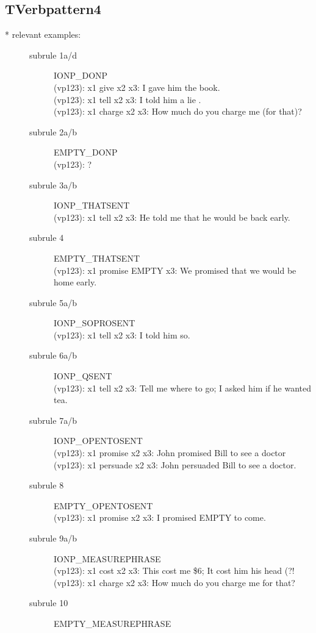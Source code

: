 \subsection {TVerbpattern4}
\begin{description}
\item[* relevant examples:] \mbox{}
\begin{description}
\item[subrule 1a/d] IONP\_DONP\\
  (vp123): x1 give x2 x3: I gave him the book.\\
  (vp123): x1 tell x2 x3: I told him a lie .\\
  (vp123): x1 charge x2 x3: How much do you charge me (for that)?\\
\item[subrule 2a/b] EMPTY\_DONP \\
  (vp123): ?\\
\item[subrule 3a/b] IONP\_THATSENT\\
  (vp123): x1 tell x2 x3: He told me that he would be back early.
\item[subrule 4] EMPTY\_THATSENT\\
  (vp123): x1 promise EMPTY x3: We promised that we would be home early.
\item[subrule 5a/b] IONP\_SOPROSENT\\
  (vp123): x1 tell x2 x3: I told him so.
\item[subrule 6a/b] IONP\_QSENT\\
  (vp123): x1 tell x2 x3: Tell me where to go; I asked him if he wanted tea.
\item[subrule 7a/b] IONP\_OPENTOSENT\\
  (vp123): x1 promise x2 x3: John promised Bill to see a doctor\\
  (vp123): x1 persuade x2 x3: John persuaded Bill to see a doctor.\\
\item[subrule 8] EMPTY\_OPENTOSENT\\
  (vp123): x1 promise x2 x3: I promised EMPTY to come.
\item[subrule 9a/b] IONP\_MEASUREPHRASE\\
  (vp123): x1 cost x2 x3: This cost me \$6; It cost him his head (?!\\
  (vp123): x1 charge x2 x3: How much do you charge me for that?\\
\item[subrule 10] EMPTY\_MEASUREPHRASE\\

\end{description}
\end{description}
